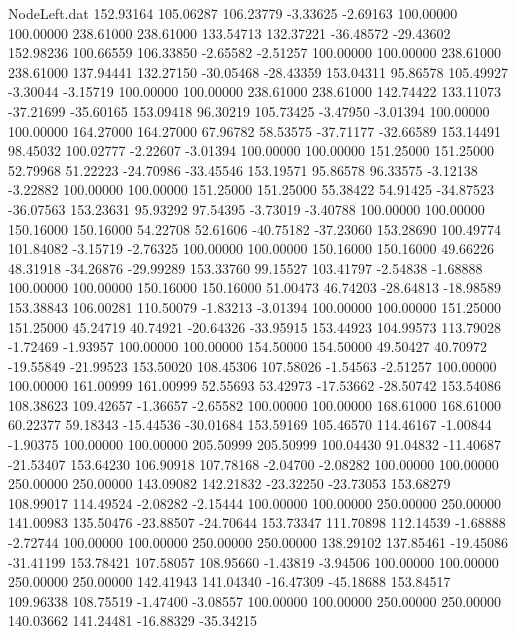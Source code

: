 \begin{filecontents}{NodeLeft.dat}
 152.93164  105.06287  106.23779    -3.33625   -2.69163  100.00000  100.00000  238.61000  238.61000  133.54713  132.37221  -36.48572  -29.43602
 152.98236  100.66559  106.33850    -2.65582   -2.51257  100.00000  100.00000  238.61000  238.61000  137.94441  132.27150  -30.05468  -28.43359
 153.04311   95.86578  105.49927    -3.30044   -3.15719  100.00000  100.00000  238.61000  238.61000  142.74422  133.11073  -37.21699  -35.60165
 153.09418   96.30219  105.73425    -3.47950   -3.01394  100.00000  100.00000  164.27000  164.27000   67.96782   58.53575  -37.71177  -32.66589
 153.14491   98.45032  100.02777    -2.22607   -3.01394  100.00000  100.00000  151.25000  151.25000   52.79968   51.22223  -24.70986  -33.45546
 153.19571   95.86578   96.33575    -3.12138   -3.22882  100.00000  100.00000  151.25000  151.25000   55.38422   54.91425  -34.87523  -36.07563
 153.23631   95.93292   97.54395    -3.73019   -3.40788  100.00000  100.00000  150.16000  150.16000   54.22708   52.61606  -40.75182  -37.23060
 153.28690  100.49774  101.84082    -3.15719   -2.76325  100.00000  100.00000  150.16000  150.16000   49.66226   48.31918  -34.26876  -29.99289
 153.33760   99.15527  103.41797    -2.54838   -1.68888  100.00000  100.00000  150.16000  150.16000   51.00473   46.74203  -28.64813  -18.98589
 153.38843  106.00281  110.50079    -1.83213   -3.01394  100.00000  100.00000  151.25000  151.25000   45.24719   40.74921  -20.64326  -33.95915
 153.44923  104.99573  113.79028    -1.72469   -1.93957  100.00000  100.00000  154.50000  154.50000   49.50427   40.70972  -19.55849  -21.99523
 153.50020  108.45306  107.58026    -1.54563   -2.51257  100.00000  100.00000  161.00999  161.00999   52.55693   53.42973  -17.53662  -28.50742
 153.54086  108.38623  109.42657    -1.36657   -2.65582  100.00000  100.00000  168.61000  168.61000   60.22377   59.18343  -15.44536  -30.01684
 153.59169  105.46570  114.46167    -1.00844   -1.90375  100.00000  100.00000  205.50999  205.50999  100.04430   91.04832  -11.40687  -21.53407
 153.64230  106.90918  107.78168    -2.04700   -2.08282  100.00000  100.00000  250.00000  250.00000  143.09082  142.21832  -23.32250  -23.73053
 153.68279  108.99017  114.49524    -2.08282   -2.15444  100.00000  100.00000  250.00000  250.00000  141.00983  135.50476  -23.88507  -24.70644
 153.73347  111.70898  112.14539    -1.68888   -2.72744  100.00000  100.00000  250.00000  250.00000  138.29102  137.85461  -19.45086  -31.41199
 153.78421  107.58057  108.95660    -1.43819   -3.94506  100.00000  100.00000  250.00000  250.00000  142.41943  141.04340  -16.47309  -45.18688
 153.84517  109.96338  108.75519    -1.47400   -3.08557  100.00000  100.00000  250.00000  250.00000  140.03662  141.24481  -16.88329  -35.34215

\end{filecontents}
